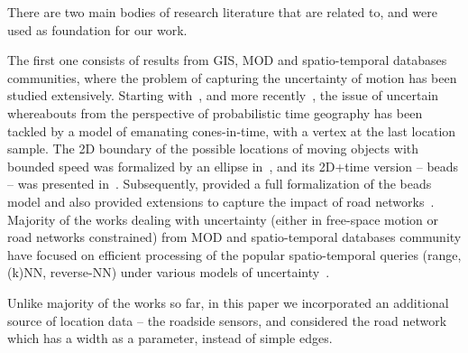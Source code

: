 There are two main bodies of research literature that are related to, and were used as
foundation for our work.

The first one consists of results from GIS, MOD and spatio-temporal databases communities, where the problem of
capturing the uncertainty of motion has been studied extensively. Starting with~\cite{hagerstrand},
and more recently~\cite{WinterY10}, the issue of uncertain whereabouts from the perspective
of probabilistic time geography has been tackled by a model of emanating cones-in-time, with a
vertex at the last location sample. The 2D boundary of the possible locations of moving objects with bounded speed was 
formalized by an ellipse in~\cite{pj99}, and its 2D+time version -- beads -- was presented in~\cite{HornsE02}.
Subsequently, \cite{Kuijpers11,Kuijpers10} provided a full formalization of the beads model and also
provided extensions to capture the impact of road networks~\cite{KuijpersMNO10}. Majority of the works
dealing with uncertainty (either in free-space motion or road networks constrained) from MOD and spatio-temporal databases community 
have focused on efficient processing of the popular spatio-temporal queries (range, (k)NN, reverse-NN)
under various models of uncertainty~\cite{GutingS05,ICDE-Tutorial14}.

Unlike majority of the works so far, in this paper we incorporated an additional source of location data -- the 
roadside sensors, and considered the road network which has a width as a parameter, instead of simple edges.

 


